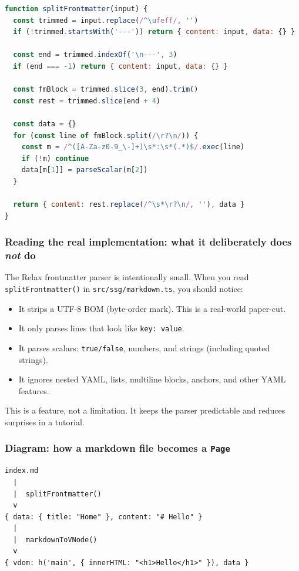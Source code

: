 \begin{lstlisting}[style=relax,language=JavaScript,caption={YAML-ish frontmatter parsing (simplified).}]
function splitFrontmatter(input) {
  const trimmed = input.replace(/^\ufeff/, '')
  if (!trimmed.startsWith('---')) return { content: input, data: {} }

  const end = trimmed.indexOf('\n---', 3)
  if (end === -1) return { content: input, data: {} }

  const fmBlock = trimmed.slice(3, end).trim()
  const rest = trimmed.slice(end + 4)

  const data = {}
  for (const line of fmBlock.split(/\r?\n/)) {
    const m = /^([A-Za-z0-9_\-]+)\s*:\s*(.*)$/.exec(line)
    if (!m) continue
    data[m[1]] = parseScalar(m[2])
  }

  return { content: rest.replace(/^\s*\r?\n/, ''), data }
}
\end{lstlisting}

\subsubsection{Reading the real implementation: what it deliberately does \emph{not} do}
The Relax frontmatter parser is intentionally small.
When you read \texttt{splitFrontmatter()} in \texttt{src/ssg/markdown.ts}, you should notice:

\begin{itemize}
  \item It strips a UTF-8 BOM (byte-order mark). This is a real-world paper-cut.
  \item It only parses lines that look like \texttt{key: value}.
  \item It parses scalars: \texttt{true/false}, numbers, and strings (including quoted strings).
  \item It ignores nested YAML, lists, multiline blocks, anchors, and other YAML features.
\end{itemize}

This is a feature, not a limitation.
It keeps the parser predictable and reduces surprises in a tutorial.

\subsubsection{Diagram: how a markdown file becomes a \texttt{Page}}
\begin{verbatim}
index.md
  |
  |  splitFrontmatter()
  v
{ data: { title: "Home" }, content: "# Hello" }
  |
  |  markdownToVNode()
  v
{ vdom: h('main', { innerHTML: "<h1>Hello</h1>" }), data }
\end{verbatim}

